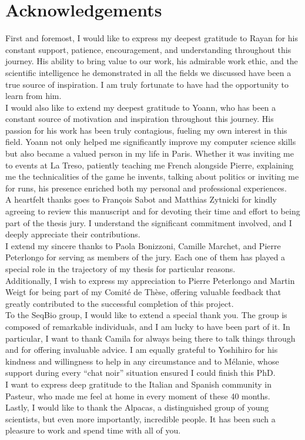 \section*{Acknowledgements}
First and foremost, I would like to express my deepest gratitude to Rayan for his constant support, patience, encouragement, and understanding throughout this journey. His ability to bring value to our work, his admirable work ethic, and the scientific intelligence he demonstrated in all the fields we discussed have been a true source of inspiration. I am truly fortunate to have had the opportunity to learn from him.\\
I would also like to extend my deepest gratitude to Yoann, who has been a constant source of motivation and inspiration throughout this journey. His passion for his work has been truly contagious, fueling my own interest in this field. Yoann not only helped me significantly improve my computer science skills but also became a valued person in my life in Paris. Whether it was inviting me to events at La Treso, patiently teaching me French alongside Pierre, explaining me the technicalities of the game he invents, talking about politics or inviting me for runs, his presence enriched both my personal and professional experiences.\\
A heartfelt thanks goes to François Sabot and Matthias Zytnicki for kindly agreeing to review this manuscript and for devoting their time and effort to being part of the thesis jury. I understand the significant commitment involved, and I deeply appreciate their contributions.\\
I extend my sincere thanks to Paola Bonizzoni, Camille Marchet, and Pierre Peterlongo for serving as members of the jury. Each one of them has played a special role in the trajectory of my thesis for particular reasons.\\
Additionally, I wish to express my appreciation to Pierre Peterlongo and Martin Weigt for being part of my Comité de Thèse, offering valuable feedback that greatly contributed to the successful completion of this project.\\
To the SeqBio group, I would like to extend a special thank you. The group is composed of remarkable individuals, and I am lucky to have been part of it. In particular, I want to thank Camila for always being there to talk things through and for offering invaluable advice. I am equally grateful to Yoshihiro for his kindness and willingness to help in any circumstance and to Mélanie, whose support during every “chat noir” situation ensured I could finish this PhD.\\
I want to express deep gratitude to the Italian and Spanish community in Pasteur, who made me feel at home in every moment of these 40 months.\\
Lastly, I would like to thank the Alpacas, a distinguished group of young scientists, but even more importantly, incredible people. It has been such a pleasure to work and spend time with all of you.\\

